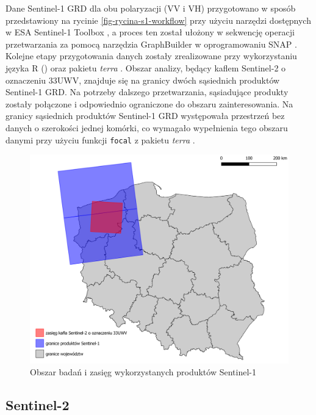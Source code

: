 \documentclass{amuthesis}
\begin{document}
Dane Sentinel-1 GRD dla obu polaryzacji (VV i VH) przygotowano w sposób
przedstawiony na rycinie \ref{fig-rycina-s1-workflow} przy użyciu
narzędzi dostępnych w ESA Sentinel-1 Toolbox \autocite{s1tbx}, a proces
ten został ułożony w sekwencję operacji przetwarzania za pomocą
narzędzia GraphBuilder w oprogramowaniu SNAP \autocite{snap}. Kolejne
etapy przygotowania danych zostały zrealizowane przy wykorzystaniu
języka R (\textcite{R-base}) oraz pakietu \emph{terra}
\autocite{R-terra}. Obszar analizy, będący kaflem Sentinel-2 o
oznaczeniu 33UWV, znajduje się na granicy dwóch sąsiednich produktów
Sentinel-1 GRD. Na potrzeby dalszego przetwarzania, sąsiadujące produkty
zostały połączone i odpowiednio ograniczone do obszaru zainteresowania.
Na granicy sąsiednich produktów Sentinel-1 GRD występowała przestrzeń
bez danych o szerokości jednej komórki, co wymagało wypełnienia tego
obszaru danymi przy użyciu funkcji \texttt{focal} z pakietu \emph{terra}
\autocite{R-terra}.

\begin{figure}[t]

{\centering \includegraphics[width=1\textwidth,height=\textheight]{figures/sen1_extents.png}

}

\caption{\label{fig-rycina-s1-extents}Obszar badań i zasięg
wykorzystanych produktów Sentinel-1}

\end{figure}

\hypertarget{sec-processing-s2}{%
\subsection{Sentinel-2}\label{sec-processing-s2}}
\end{document}
